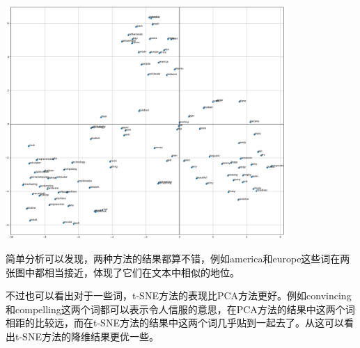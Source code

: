 \documentclass[12pt, UTF8]{article}
\begin{document}
\begin{center}
  \includegraphics[width=0.8\textwidth]{tsne.png}
\end{center}

简单分析可以发现，两种方法的结果都算不错，例如america和europe这些词在两张图中都相当接近，体现了它们在文本中相似的地位。

不过也可以看出对于一些词，t-SNE方法的表现比PCA方法更好。例如convincing和compelling这两个词都可以表示令人信服的意思，在PCA方法的结果中这两个词相距的比较远，而在t-SNE方法的结果中这两个词几乎贴到一起去了。从这可以看出t-SNE方法的降维结果更优一些。
\end{document}

